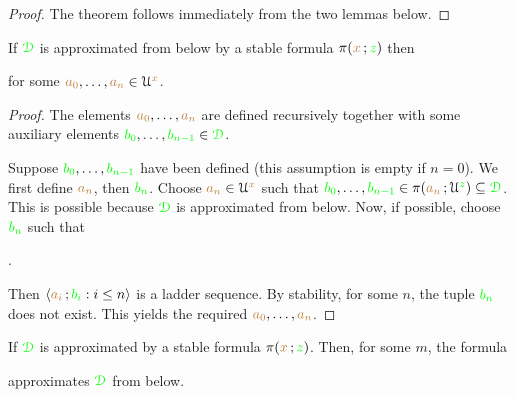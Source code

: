 \begin{proof}
  The theorem follows immediately from the two lemmas below.
\end{proof}

\begin{lemma}
If ${\color{green}\EuScript D}$ is approximated from below by a stable formula $\pi({\color{brown} x}\,;{\color{green} z})$ then


for some ${\color{brown} a_0},\dots,{\color{brown} a_n}\in\EuScript U^{\color{brown} x}$.
\end{lemma}

\begin{proof}
The elements ${\color{brown} a_0},\dots,{\color{brown} a_n}$ are defined recursively together with some auxiliary elements ${\color{green} b_0},\dots,{\color{green} b_{n-1}}\in{\color{green}\EuScript D}$.

Suppose ${\color{green} b_0},\dots,{\color{green} b_{n-1}}$ have been defined (this assumption is empty if $n=0$).
We first define ${\color{brown} a_n}$, then ${\color{green} b_n}$.
Choose ${\color{brown} a_n}\in\EuScript U^{\color{brown} x}$ such that ${\color{green} b_0},\dots,{\color{green} b_{n-1}}\in\pi({\color{brown} a_n}\,;\EuScript U^{\color{green} z})\subseteq{\color{green}\EuScript D}$.
This is possible because ${\color{green}\EuScript D}$ is approximated from below.
Now, if possible, choose ${\color{green} b_n}$ such that

.

Then $\langle{\color{brown}a_i}\,;{\color{green} b_i} : i\le n\rangle$ is a ladder sequence.
By stability, for some $n$, the tuple ${\color{green} b_n}$ does not exist.
This yields the required ${\color{brown} a_0},\dots,{\color{brown} a_n}$.
\end{proof}

\begin{lemma}\label{lem_stab_approx_below}
If ${\color{green}\EuScript D}$ is approximated by a stable formula $\pi({\color{brown} x}\,;{\color{green} z})$.
Then, for some $m$, the formula


approximates ${\color{green}\EuScript D}$ from below.
\end{lemma}

